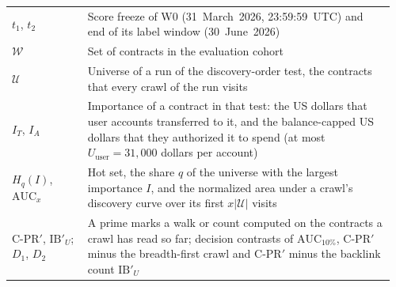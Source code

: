 \begin{longtable}{@{}>{\raggedright\arraybackslash}p{0.19\linewidth}p{0.77\linewidth}@{}}
$t_1$, $t_2$ & Score freeze of W0 (31~March~2026, 23:59:59~UTC) and end of its label window (30~June~2026) \\
$\mathcal{W}$ & Set of contracts in the evaluation cohort \\
$\mathcal{U}$ & Universe of a run of the discovery-order test, the contracts that every crawl of the run visits \\
$I_T$, $I_A$ & Importance of a contract in that test: the US dollars that user accounts transferred to it, and the balance-capped US dollars that they authorized it to spend (at most $U_{\mathrm{user}}=31{,}000$ dollars per account) \\
$H_q(I)$, $\mathrm{AUC}_{x}$ & Hot set, the share $q$ of the universe with the largest importance $I$, and the normalized area under a crawl's discovery curve over its first $x|\mathcal{U}|$ visits \\
\mbox{C-PR}$'$, $\mathrm{IB}'_U$; $D_1$, $D_2$ & A prime marks a walk or count computed on the contracts a crawl has read so far; decision contrasts of $\mathrm{AUC}_{10\%}$, \mbox{C-PR}$'$ minus the breadth-first crawl and \mbox{C-PR}$'$ minus the backlink count $\mathrm{IB}'_U$ \\
\end{longtable}
\endgroup

\let\thetable\FrontMatterSavedThetable
